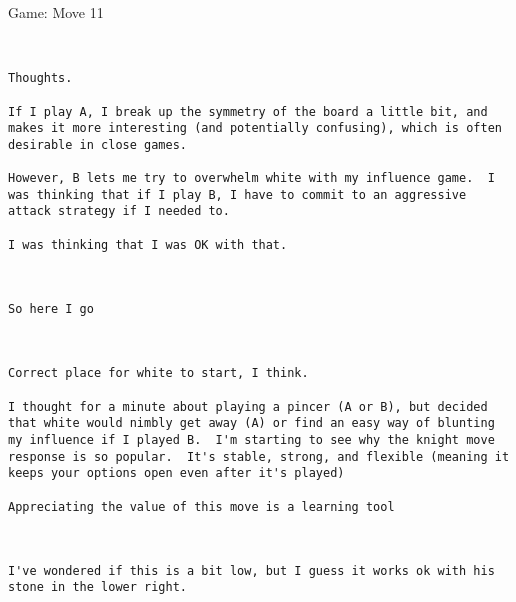 \documentclass{article}
\begin{document}
\begin{section}{Game: Move 11}
\begin{center}
\cleargoban
{}
\showfullgoban
\\\begin{lstlisting}
Thoughts.

If I play A, I break up the symmetry of the board a little bit, and makes it more interesting (and potentially confusing), which is often desirable in close games.

However, B lets me try to overwhelm white with my influence game.  I was thinking that if I play B, I have to commit to an aggressive attack strategy if I needed to.

I was thinking that I was OK with that.\end{lstlisting}
\end{center}
\begin{center}
\cleargoban
{}
\showfullgoban
\\\begin{lstlisting}
So here I go
\end{lstlisting}
\end{center}
\begin{center}
\cleargoban
{}
\showfullgoban
\\\begin{lstlisting}
Correct place for white to start, I think.

I thought for a minute about playing a pincer (A or B), but decided that white would nimbly get away (A) or find an easy way of blunting my influence if I played B.  I'm starting to see why the knight move response is so popular.  It's stable, strong, and flexible (meaning it keeps your options open even after it's played)

Appreciating the value of this move is a learning tool\end{lstlisting}
\end{center}
\begin{center}
\cleargoban
{}
\showfullgoban
\\\begin{lstlisting}
I've wondered if this is a bit low, but I guess it works ok with his stone in the lower right.


\end{lstlisting}
\end{center}
\end{section}
\end{document}
